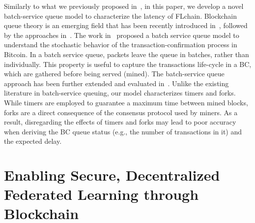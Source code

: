 \documentclass[10pt,journal,compsoc]{IEEEtran}
\begin{document}
Similarly to what we previously proposed in~\cite{wilhelmi2021discrete}, in this paper, we develop a novel batch-service queue model to characterize the latency of FLchain. Blockchain queue theory is an emerging field that has been recently introduced in~\cite{kawase2017transaction}, followed by the approaches in~\cite{kawase2018batch, li2018blockchain, geissler2019discrete}. The work in~\cite{kawase2017transaction} proposed a batch service queue model to understand the stochastic behavior of the transaction-confirmation process in Bitcoin. In a batch service queue, packets leave the queue in batches, rather than individually. This property is useful to capture the transactions life-cycle in a BC, which are gathered before being served (mined). The batch-service queue approach has been further extended and evaluated in~\cite{kawase2018batch, li2018blockchain}. Unlike the existing literature in batch-service queuing, our model characterizes timers and forks. While timers are employed to guarantee a maximum time between mined blocks, forks are a direct consequence of the consensus protocol used by miners. As a result, disregarding the effects of timers and forks may lead to poor accuracy when deriving the BC queue status (e.g., the number of transactions in it) and the expected delay.


\section{Enabling Secure, Decentralized Federated Learning through Blockchain}
\label{section:bc_fl}

\end{document}
